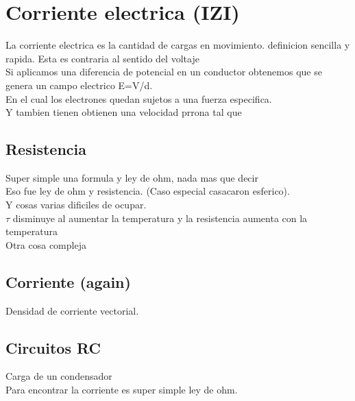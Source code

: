 \newpage
\section{Corriente electrica (IZI)}
La corriente electrica es la cantidad de cargas en movimiento. definicion sencilla y rapida. Esta es contraria al sentido del voltaje\\
Si aplicamos una diferencia de potencial en un conductor obtenemos que se genera un campo electrico E=V/d.\\
En el cual los electrones quedan sujetos a una fuerza especifica.
\\ Y tambien tienen obtienen una velocidad prrona tal que
\\
\subsection{Resistencia}
Super simple una formula y ley de ohm, nada mas que decir
\\
Eso fue ley de ohm y resistencia. (Caso especial casacaron esferico).
\\
Y cosas varias dificiles de ocupar.
\\
$\tau$ disminuye al aumentar la temperatura y la resistencia aumenta con la temperatura\\
Otra cosa compleja
\subsection{Corriente (again)}
Densidad de corriente vectorial.
\\
\subsection{Circuitos RC}
Carga de un condensador
\\
Para encontrar la corriente es super simple ley de ohm.
\newpage





